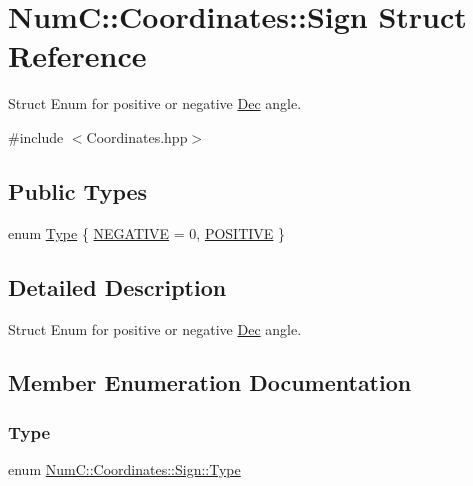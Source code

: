 \hypertarget{struct_num_c_1_1_coordinates_1_1_sign}{}\section{NumC\+:\+:Coordinates\+:\+:Sign Struct Reference}
\label{struct_num_c_1_1_coordinates_1_1_sign}


Struct Enum for positive or negative \mbox{\hyperlink{class_num_c_1_1_coordinates_1_1_dec}{Dec}} angle.  




{\ttfamily \#include $<$Coordinates.\+hpp$>$}

\subsection*{Public Types}
\begin{DoxyCompactItemize}
\item 
enum \mbox{\hyperlink{struct_num_c_1_1_coordinates_1_1_sign_a915938d7fce678936d8728ca14a70e22}{Type}} \{ \mbox{\hyperlink{struct_num_c_1_1_coordinates_1_1_sign_a915938d7fce678936d8728ca14a70e22a1accb4ea5527ad47f8edbfe574e61c93}{N\+E\+G\+A\+T\+I\+VE}} = 0, 
\mbox{\hyperlink{struct_num_c_1_1_coordinates_1_1_sign_a915938d7fce678936d8728ca14a70e22abeac06488163bc8e943cc8f8cbf317ba}{P\+O\+S\+I\+T\+I\+VE}}
 \}
\end{DoxyCompactItemize}


\subsection{Detailed Description}
Struct Enum for positive or negative \mbox{\hyperlink{class_num_c_1_1_coordinates_1_1_dec}{Dec}} angle. 

\subsection{Member Enumeration Documentation}
\mbox{\label{struct_num_c_1_1_coordinates_1_1_sign_a915938d7fce678936d8728ca14a70e22}} 
\subsubsection{\texorpdfstring{Type}{Type}}
{\footnotesize\ttfamily enum \mbox{\hyperlink{struct_num_c_1_1_coordinates_1_1_sign_a915938d7fce678936d8728ca14a70e22}{Num\+C\+::\+Coordinates\+::\+Sign\+::\+Type}}}

